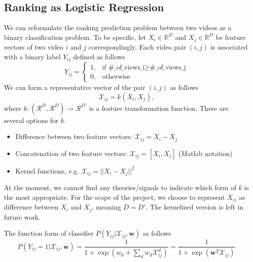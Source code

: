 \subsection{Ranking as Logistic Regression}
We can reformulate the ranking prediction problem between two videos as a binary classification problem. To be specific, let $X_i \in \mathbb{R}^D$ and $X_j \in \mathbb{R}^D$ be feature vectors of two video $i$ and $j$ correspondingly. Each video pair $(i, j)$ is associated with a binary label $Y_{ij}$ defined as follows
\begin{equation}
	Y_{ij} = \begin{cases}
			   1, & \text{if } \text{\#\_of\_views\_i} \geq \text{\#\_of\_views\_j} \\
			   0, & \text{otherwise}
			\end{cases} 
\end{equation}	
 We can form a representative vector of the pair $(i, j)$ as follows
\begin{equation}
	\mathcal{X}_{ij} = k (X_i, X_j),
\end{equation}
where $k: (\mathcal{R}^D, \mathcal{R}^D) \rightarrow \mathcal{R}^{D'}$ is a feature transformation function. There are several options for $k$. 
\begin{itemize}
	\item Difference between two feature vectors: $\mathcal{X}_{ij} = X_i - X_j$
	\item Concatenation of two feature vectors:  $\mathcal{X}_{ij} = [X_i, X_j]$ (Matlab notation)
	\item Kernel functions, e.g. $\mathcal{X}_{ij} = || X_i - X_j ||^2$
\end{itemize}
At the moment, we cannot find any theories/signals to indicate which form of $k$ is the most appropriate. For the scope of the project, we choose to represent $X_{ij}$ as difference between $X_i$ and $X_j$, meaning $D = D'$. The kernelized version is left in future work. 

The function form of classifier $P(Y_{ij}|\mathcal{X}_{ij}, \textbf{w})$ as follows
 \begin{equation}
	 P(Y_{ij}=1|\mathcal{X}_{ij}, \textbf{w}) = \frac{1}{1 + \exp ( w_0 + \sum_d w_d \mathcal{X}_{ij}^d )} = \frac{1}{1 + \exp (\textbf{w}^T \mathcal{X}_{ij})}
 \end{equation}
 

